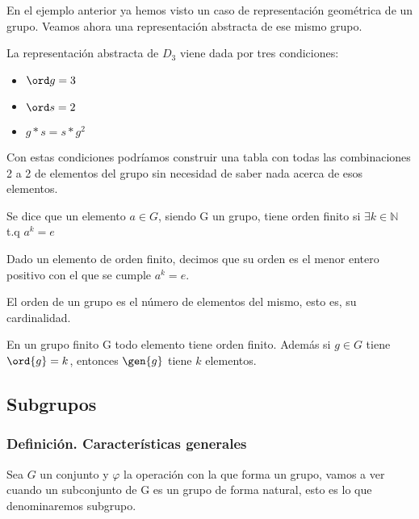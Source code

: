 \documentclass[nochap]{apuntes}
\begin{document}
En el ejemplo anterior ya hemos visto un caso de representación geométrica de un grupo. Veamos ahora una representación abstracta de ese mismo
grupo.
\begin{example}
  La representación abstracta de $D_{3}$  viene dada por tres condiciones:
  \begin{itemize}
    \item $\ord g=3$
    \item $\ord s=2$
    \item $g\ast s=s\ast g^{2}$
  \end{itemize}

  Con estas condiciones podríamos construir una tabla con todas las combinaciones 2 a 2 de elementos del grupo sin necesidad
  de saber nada acerca de esos elementos.
\end{example}

\begin{defn}
  Se dice que un elemento $a\in G$, siendo G un grupo, tiene orden finito si $\exists k\in\mathbb{N}$  t.q  $a^{k}=e$
\end{defn}

\begin{defn}
  Dado un elemento de orden finito, decimos que su orden es el menor entero positivo con el que se cumple $a^{k}=e$.
\end{defn}

\begin{defn}
  El orden de un grupo es el número de elementos del mismo, esto es, su cardinalidad.
\end{defn}

\begin{theorem}
  En un grupo finito G todo elemento tiene orden finito. Además si $g\in G$ tiene $\ord{g}=k$, entonces $\gen{g}$ tiene $k$ elementos.
\end{theorem}

\subsection{Subgrupos}
\subsubsection{Definición. Características generales}
  Sea $G$ un conjunto y $\varphi$  la operación con la que forma un grupo, vamos a ver cuando un subconjunto de G es un grupo de forma natural,
  esto es lo que denominaremos subgrupo.
\end{document}
